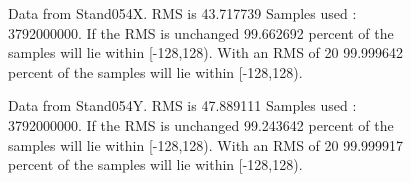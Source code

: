 \begin{figure}[ht] 				 				 				\caption{Data from Stand054X. RMS is 43.717739 Samples used : 3792000000. If the RMS is unchanged 99.662692 percent of the samples will lie within [-128,128).  				 With an RMS of 20 99.999642 percent of the samples will lie within [-128,128).} 				\end{figure} 

\begin{figure}[ht] 				 				 				\caption{Data from Stand054Y. RMS is 47.889111 Samples used : 3792000000. If the RMS is unchanged 99.243642 percent of the samples will lie within [-128,128).  				 With an RMS of 20 99.999917 percent of the samples will lie within [-128,128).} 				\end{figure} 

